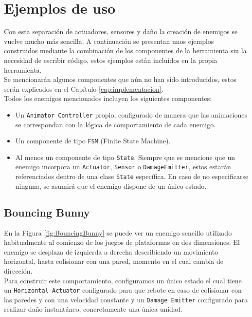 \section{Ejemplos de uso}
Con esta separación de actuadores, sensores y daño la creación de enemigos se vuelve mucho más sencilla. A continuación se presentan unos ejemplos construidos mediante la combinación de los componentes de la herramienta sin la necesidad de escribir código, estos ejemplos están incluidos en la propia herramienta.\\


Se mencionarán algunos componentes que aún no han sido introducidos, estos serán explicados en el Capítulo \ref{cap:implementacion}.\\


Todos los enemigos mencionados incluyen los siguientes componentes:

\begin{itemize}
\item Un \texttt{Animator Controller} propio, configurado de manera que las animaciones se correspondan con la lógica de comportamiento de cada enemigo.
\item Un componente de tipo \texttt{FSM} (Finite State Machine).
\item Al menos un componente de tipo \texttt{State}. Siempre que se mencione que un enemigo incorpora un \texttt{Actuator}, \texttt{Sensor} o \texttt{DamageEmitter}, estos estarán referenciados dentro de una clase \texttt{State} específica. En caso de no especificarse ninguna, se asumirá que el enemigo dispone de un único estado.
\end{itemize}

\subsection{Bouncing Bunny}

En la Figura \ref{fig:BouncingBunny} se puede ver un enemigo sencillo utilizado habitualmente al comienzo de los juegos de plataformas en dos dimensiones. El enemigo se desplaza de izquierda a derecha describiendo un movimiento horizontal, hasta colisionar con una pared, momento en el cual cambia de dirección.\\

Para construir este comportamiento, configuramos un único estado el cual tiene un \texttt{Horizontal Actuator} configurado para que rebote en caso de colisionar con las paredes y con una velocidad constante y un \texttt{Damage Emitter} configurado para realizar daño instantáneo, concretamente una única unidad.\\

